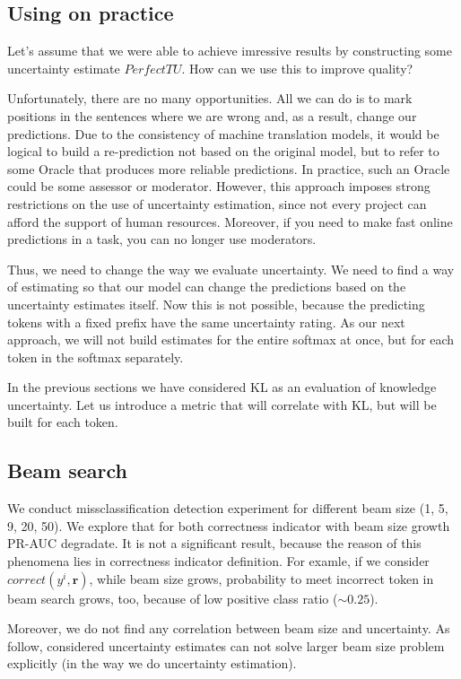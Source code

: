 \documentclass[a4paper,14pt]{extarticle}
\begin{document}
\subsection{Using on practice}
	Let's assume that we were able to achieve imressive results by constructing some uncertainty estimate $PerfectTU$. How can we use this to improve quality?

	Unfortunately, there are no many opportunities. All we can do is to mark positions in the sentences where we are wrong and, as a result, change our predictions. Due to the consistency of machine translation models, it would be logical to build a re-prediction not based on the original model, but to refer to some Oracle that produces more reliable predictions. In practice, such an Oracle could be some assessor or moderator. However, this approach imposes strong restrictions on the use of uncertainty estimation, since not every project can afford the support of human resources. Moreover, if you need to make fast online predictions in a task, you can no longer use moderators.

	Thus, we need to change the way we evaluate uncertainty. We need to find a way of estimating so that our model can change the predictions based on the uncertainty estimates itself. Now this is not possible, because the predicting tokens with a fixed prefix have the same uncertainty rating. As our next approach, we will not build estimates for the entire softmax at once, but for each token in the softmax separately.

	In the previous sections we have considered KL as an evaluation of knowledge uncertainty. Let us introduce a metric that will correlate with KL, but will be built for each token.
	
\subsection{Beam search}
	We conduct missclassification detection experiment for different beam size (1, 5, 9, 20, 50). We explore that for both correctness indicator with beam size growth PR-AUC degradate. It is not a significant result, because the reason of this phenomena lies in correctness indicator definition. For examle, if we consider $correct(y^i, \textbf{r})$, while beam size grows, probability to meet incorrect token in beam search grows, too, because of low positive class ratio ($\sim 0.25$).
	
	Moreover, we do not find any correlation between beam size and uncertainty. As follow, considered uncertainty estimates can not solve larger beam size problem explicitly (in the way we do uncertainty estimation).
\end{document}
